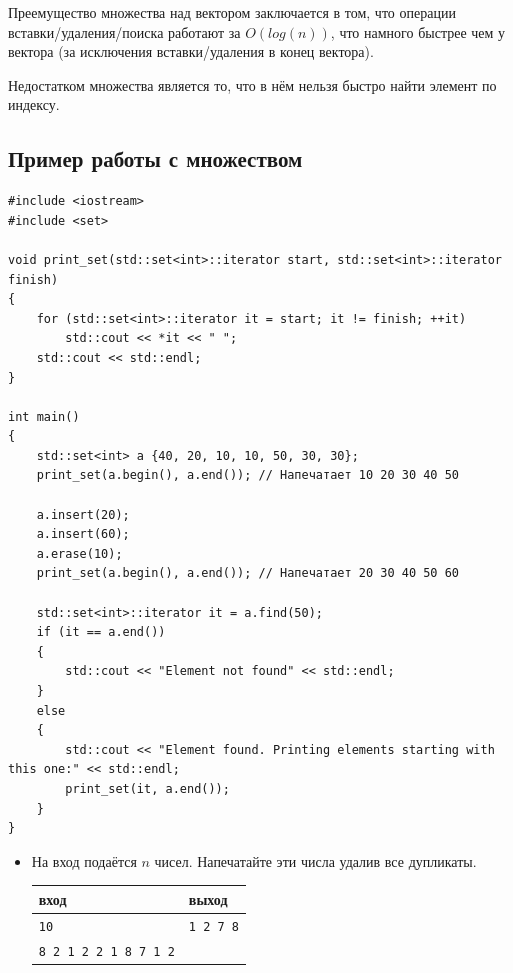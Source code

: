 \documentclass{article}
\begin{document}
Преемущество множества над вектором заключается в том, что операции вставки/удаления/поиска работают за $O(log(n))$, что намного быстрее чем у вектора (за исключения вставки/удаления в конец вектора).

Недостатком множества является то, что в нём нельзя быстро найти элемент по индексу.




\newpage
\subsection*{Пример работы с множеством}

\begin{lstlisting}
#include <iostream>
#include <set>

void print_set(std::set<int>::iterator start, std::set<int>::iterator finish)
{
    for (std::set<int>::iterator it = start; it != finish; ++it)
        std::cout << *it << " ";
    std::cout << std::endl;
}

int main()
{
    std::set<int> a {40, 20, 10, 10, 50, 30, 30}; 
    print_set(a.begin(), a.end()); // Напечатает 10 20 30 40 50
    
    a.insert(20);
    a.insert(60);
    a.erase(10);
    print_set(a.begin(), a.end()); // Напечатает 20 30 40 50 60
    
    std::set<int>::iterator it = a.find(50);
    if (it == a.end())
    {
        std::cout << "Element not found" << std::endl;
    }
    else
    {
        std::cout << "Element found. Printing elements starting with this one:" << std::endl;
        print_set(it, a.end());
    }
}
\end{lstlisting}


\begin{itemize}
\item На вход подаётся $n$ чисел. Напечатайте эти числа удалив все дупликаты.
\begin{center}
\begin{tabular}{ l | l }
 вход & выход \\ \hline
 \texttt{10} & \texttt{1 2 7 8}  \\ 
 \texttt{8 2 1 2 2 1 8 7 1 2} &  \\
\end{tabular}
\end{center}



\end{itemize}
\end{document}
